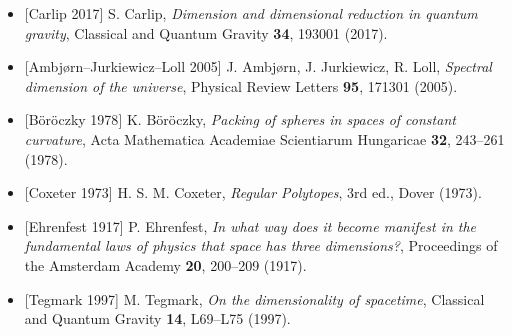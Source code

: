 \documentclass[
]{ltjsarticle}
\providecommand{\tightlist}{%
  \setlength{\itemsep}{0pt}\setlength{\parskip}{0pt}}
\begin{document}
\begin{itemize}
\tightlist
\item
  {[}Carlip 2017{]} S. Carlip, \emph{Dimension and dimensional reduction
  in quantum gravity}, Classical and Quantum Gravity \textbf{34}, 193001
  (2017).
\item
  {[}Ambjørn--Jurkiewicz--Loll 2005{]} J. Ambjørn, J. Jurkiewicz, R.
  Loll, \emph{Spectral dimension of the universe}, Physical Review
  Letters \textbf{95}, 171301 (2005).
\item
  {[}Böröczky 1978{]} K. Böröczky, \emph{Packing of spheres in spaces of
  constant curvature}, Acta Mathematica Academiae Scientiarum Hungaricae
  \textbf{32}, 243--261 (1978).
\item
  {[}Coxeter 1973{]} H. S. M. Coxeter, \emph{Regular Polytopes}, 3rd
  ed., Dover (1973).
\item
  {[}Ehrenfest 1917{]} P. Ehrenfest, \emph{In what way does it become
  manifest in the fundamental laws of physics that space has three
  dimensions?}, Proceedings of the Amsterdam Academy \textbf{20},
  200--209 (1917).
\item
  {[}Tegmark 1997{]} M. Tegmark, \emph{On the dimensionality of
  spacetime}, Classical and Quantum Gravity \textbf{14}, L69--L75
  (1997).
\end{itemize}
\end{document}
